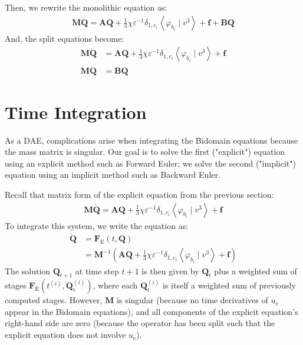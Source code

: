 \documentclass{article}
\newcommand{\bvec}[1]{\boldsymbol{#1}}
\newcommand{\bmat}[1]{\boldsymbol{#1}}
\begin{document}
\noindent Then, we rewrite the monolithic equation as:
\begin{align*}
    \bmat{M} \dot{\bvec{Q}}
        = \bmat{A} \bvec{Q}
            + \frac{1}{3} \chi \varepsilon^{-1} \delta_{1, c_i} \left< \varphi_{b_i} \mid v^3 \right>
            + \bvec{f}
            + \bmat{B} \bvec{Q}
\end{align*}
\noindent And, the split equations become:
\begin{align*}
    \bmat{M} \dot{\bvec{Q}}
        & = \bmat{A} \bvec{Q}
            + \frac{1}{3} \chi \varepsilon^{-1} \delta_{1, c_i} \left< \varphi_{b_i} \mid v^3 \right>
            + \bvec{f} \\
    \bmat{M} \dot{\bvec{Q}}
        & = \bmat{B} \bvec{Q}
\end{align*}

\newpage
\section{Time Integration}

As a DAE, complications arise when integrating the Bidomain equations
because the mass matrix is singular.
Our goal is to solve the first ("explicit") equation using an explicit method such as Forward Euler;
we solve the second ("implicit") equation using an implicit method such as Backward Euler.

Recall that matrix form of the explicit equation from the previous section:
\begin{align*}
    \bmat{M} \dot{\bvec{Q}}
        = \bmat{A} \bvec{Q}
            + \frac{1}{3} \chi \varepsilon^{-1} \delta_{1, c_i}
                \left< \varphi_{b_i} \mid v^3 \right>
            + \bvec{f}
\end{align*}
\noindent To integrate this system, we write the equation as:
\begin{align*}
    \dot{\bvec{Q}}
        & = \bvec{F}_\text{E}(t, \bvec{Q}) \\
        & = \bmat{M}^{-1}
            (\bmat{A} \bvec{Q}
                + \frac{1}{3} \chi \varepsilon^{-1} \delta_{1, c_i}
                    \left< \varphi_{b_i} \mid v^3 \right>
                + \bvec{f})
\end{align*}
\noindent The solution $\bvec{Q}_{t + 1}$ at time step $t + 1$
is then given by $\bvec{Q}_t$ plus a weighted sum of stages
$\bvec{F}_\text{E}(t^{(i)}, \bvec{Q}_t^{(i)})$,
where each $\bvec{Q}_t^{(i)}$ is itself a weighted sum of previously computed stages.
However, $\bmat{M}$ is singular
(because no time derivatives of $u_\text{e}$ appear in the Bidomain equations),
and all components of the explicit equation's right-hand side are zero
(because the operator has been split such that the explicit equation does not involve $u_\text{e}$).
\end{document}
